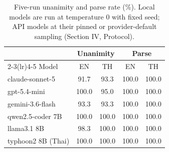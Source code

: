 \begin{table}[t]
\caption{Five-run unanimity and parse rate (\%). Local models are run
at temperature 0 with fixed seed; API models at their pinned or
provider-default sampling (Section IV, Protocol).}
\label{tab:stability}
\centering\small
\begin{tabular}{lcccc}
\toprule
 & \multicolumn{2}{c}{Unanimity} & \multicolumn{2}{c}{Parse} \\
\cmidrule(lr){2-3}\cmidrule(lr){4-5}
Model & EN & TH & EN & TH \\
\midrule
claude-sonnet-5 & 91.7 & 93.3 & 100.0 & 100.0 \\
gpt-5.4-mini & 100.0 & 95.0 & 100.0 & 100.0 \\
gemini-3.6-flash & 93.3 & 93.3 & 100.0 & 100.0 \\
qwen2.5-coder 7B & 100.0 & 100.0 & 100.0 & 100.0 \\
llama3.1 8B & 98.3 & 100.0 & 100.0 & 100.0 \\
typhoon2 8B (Thai) & 100.0 & 100.0 & 100.0 & 100.0 \\
\bottomrule
\end{tabular}
\end{table}

